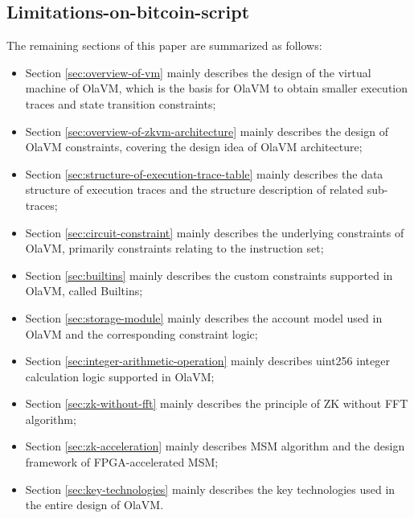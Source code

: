 \subsection{Limitations-on-bitcoin-script}

The remaining sections of this paper are summarized as follows:
\begin{itemize}
    \item Section \ref{sec:overview-of-vm} mainly describes the design of the virtual machine of OlaVM, which is the basis for OlaVM to obtain smaller execution traces and state transition constraints;
    \item Section \ref{sec:overview-of-zkvm-architecture} mainly describes the design of OlaVM constraints, covering the design idea of OlaVM architecture;
    \item Section \ref{sec:structure-of-execution-trace-table} mainly describes the data structure of execution traces and the structure description of related sub-traces;
    \item Section \ref{sec:circuit-constraint} mainly describes the underlying constraints of OlaVM, primarily constraints relating to the instruction set;
    \item Section \ref{sec:builtins} mainly describes the custom constraints supported in OlaVM, called Builtins;
    \item Section \ref{sec:storage-module} mainly describes the account model used in OlaVM and the corresponding constraint logic;
    \item Section \ref{sec:integer-arithmetic-operation} mainly describes uint256 integer calculation logic supported in OlaVM;
    \item Section \ref{sec:zk-without-fft} mainly describes the principle of ZK without FFT algorithm;
    \item Section \ref{sec:zk-acceleration} mainly describes MSM algorithm and the design framework of FPGA-accelerated MSM;
    \item Section \ref{sec:key-technologies} mainly describes the key technologies used in the entire design of OlaVM.
\end{itemize}
